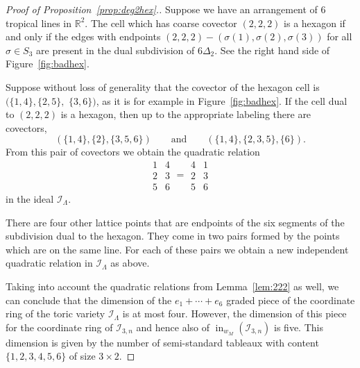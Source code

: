 \documentclass[ALCO,ThmDefs,Unicode,epreuves]{cedram}
\DeclareMathOperator{\ini}{in}
\newcommand{\I}{\mathcal{I}}
\begin{document}
\begin{proof}[Proof of Proposition~\ref{prop:deg2hex}.] 
Suppose we have an arrangement of $6$ tropical lines in $\mathbb{R}^2$.
The cell which has coarse covector $(2, 2, 2)$ is a hexagon if and only if the edges with endpoints $(2, 2, 2) - (\sigma(1), \sigma(2), \sigma(3))$ for all $\sigma \in S_3$ are present in the 
dual subdivision of $6\Delta_2$. See the right hand side of Figure~\ref{fig:badhex}.

Suppose without loss of generality that the covector of the hexagon cell is $(\{1,4\},\{2, 5\},$ $\{3, 6\})$, as it is for example in Figure~\ref{fig:badhex}.
If the cell dual to $(2, 2, 2)$ is a hexagon, then up to the appropriate labeling there are covectors, 
\[
(\{1,4\}, \{2\}, \{3, 5, 6\}) \qquad\text{and}\qquad (\{1,4\}, \{ 2, 3, 5\}, \{6\}). 
\]
From this pair of covectors we obtain the quadratic relation 
\[
\begin{array}{c}1 \\2 \\5\end{array} 
\begin{array}{c}4 \\3 \\6\end{array} = 
\begin{array}{c}4 \\2 \\5\end{array} 
\begin{array}{c}1 \\3 \\6\end{array}
\]
in the ideal $\I_{\Lambda}$. 

There are four other lattice points that are endpoints of the six segments of the subdivision dual to the hexagon. 
They come in two pairs formed by the points which are on the same line. For each of these pairs we obtain a new 
 independent quadratic relation in $\I_{\Lambda}$ as above. 
 
Taking into account the quadratic relations from Lemma~\ref{lem:222} as well, we can conclude that the dimension of the $e_1 + \cdots +e_6$ graded piece of the coordinate ring of the toric variety $\I_{\Lambda}$ is at most four. However, the dimension of this piece for the coordinate ring of $\I_{3, n}$ and 
hence also of $\ini_{w_M}(\I_{3, n})$ is five. This dimension is given by the number of semi-standard tableaux with content $\{1, 2, 3, 4, 5, 6\}$ of size $3 \times 2$. %



\end{proof}
\end{document}
